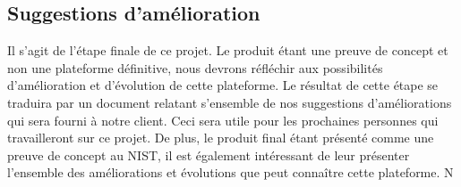 \subsection{Suggestions d'amélioration}
Il s'agit de l'étape finale de ce projet. Le produit étant une preuve de concept et non une plateforme définitive, nous devrons réfléchir aux possibilités d'amélioration et d'évolution de cette plateforme. Le résultat de cette étape se traduira par un document relatant s'ensemble de nos suggestions d'améliorations qui sera fourni à notre client. Ceci sera utile pour les prochaines personnes qui travailleront sur ce projet. De plus, le produit final étant présenté comme une preuve de concept au NIST, il est également intéressant de leur présenter l'ensemble des améliorations et évolutions que peut connaître cette plateforme.
N
